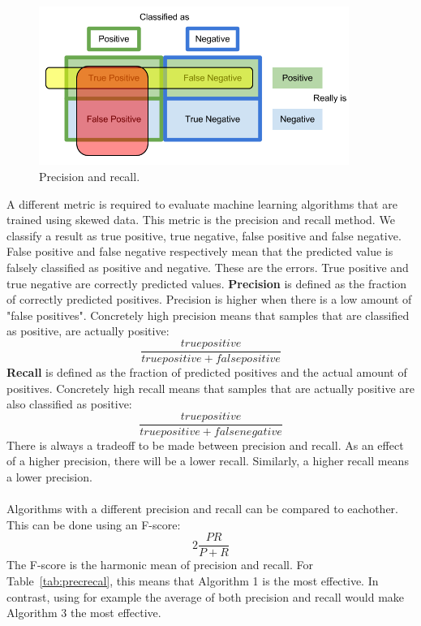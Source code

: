 \begin{figure}[H]
\centering
\includegraphics[width=0.9\textwidth]{Figures/precisionrecall}
\decoRule
\caption[Precision and recall]{Precision and recall. \cite{recall-fig}}
\label{fig:precisionrecall}
\end{figure}
\noindent A different metric is required to evaluate machine learning algorithms that are trained using skewed data. This metric is the precision and recall method. We classify a result as true positive, true negative, false positive and false negative. False positive and false negative respectively mean that the predicted value is falsely classified as positive and negative. These are the errors. True positive and true negative are correctly predicted values. \textbf{Precision} is defined as the fraction of correctly predicted positives. Precision is higher when there is a low amount of "false positives". Concretely high precision means that samples that are classified as positive, are actually positive:
$$\dfrac{true positive}{true positive + false positive}$$
\textbf{Recall} is defined as the fraction of predicted positives and the actual amount of positives. Concretely high recall means that samples that are actually positive are also classified as positive:
$$\dfrac{true positive}{true positive + false negative}$$
There is always a tradeoff to be made between precision and recall. As an effect of a higher precision, there will be a lower recall. Similarly, a higher recall means a lower precision.\\\\
Algorithms with a different precision and recall can be compared to eachother. This can be done using an F-score: 
$$2 \dfrac{PR}{P+R}$$
\noindent The F-score is the harmonic mean of precision and recall. For Table~\ref{tab:precrecal}, this means that Algorithm 1 is the most effective. In contrast, using for example the average of both precision and recall would make Algorithm 3 the most effective.\\\\
